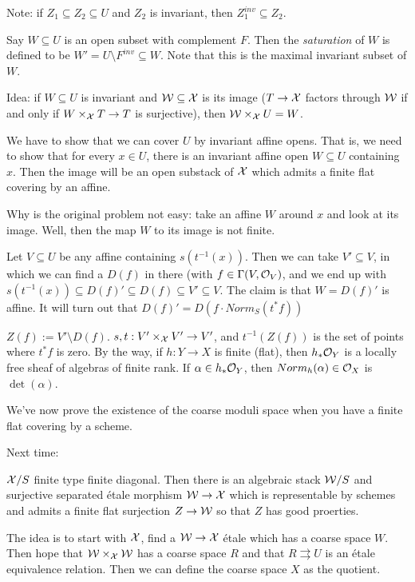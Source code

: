 Note: if $Z_1\subseteq Z_2\subseteq U$ and $Z_2$ is invariant, then
$Z_1^{inv}\subseteq Z_2$. 

Say $W\subseteq U$ is an open subset with complement $F$. Then the
\emph{saturation} of $W$ is defined to be $W'=U\setminus
F^{inv}\subseteq W$. Note that this is the maximal invariant subset
of $W$.

Idea: if $W\subseteq U$ is invariant and $\mathcal{W}\subseteq \mathcal{X}$ is its
image ($T\to \mathcal{X}$ factors through $\mathcal{W}$ if and only if $W\times_{\mathcal{X}} T\to
T$ is surjective), then $\mathcal{W}\times_{\mathcal{X}} U=W$.

We have to show that we can cover $U$ by invariant affine opens. That
is, we need to show that for every $x\in U$, there is an invariant
affine open $W\subseteq U$ containing $x$. Then the image will be an
open substack of $\mathcal{X}$ which admits a finite flat covering by an
affine.

Why is the original problem not easy: take an affine $W$ around $x$
and look at its image. Well, then the map $W$ to its image is not
finite.

Let $V\subseteq U$ be any affine containing $s(t^{-1}(x))$. Then we
can take $V'\subseteq V$, in which we can find a $D(f)$ in there
(with $f\in \Gamma(V,\mathcal{O}_V)$, and we end up with $s(t^{-1}(x))\subseteq
D(f)'\subseteq D(f)\subseteq V'\subseteq V$. The claim is that
$W=D(f)'$ is affine. It will turn out that $D(f)'=D(f\cdot
Norm_S(t^*f))$

$Z(f):= V'\setminus D(f)$. $s,t:V'\times_{\mathcal{X}} V'\to V'$, and
$t^{-1}(Z(f))$ is the set of points where $t^*f$ is zero. By the way,
if $h:Y\to X$ is finite (flat), then $h_*\mathcal{O}_Y$ is a locally free
sheaf of algebras of finite rank. If $\alpha\in h_*\mathcal{O}_Y$, then
$Norm_h(\alpha)\in \mathcal{O}_X$ is $\det (\alpha)$.

We've now prove the existence of the coarse moduli space when you
have a finite flat covering by a scheme.

Next time:
\begin{theorem}
  $\mathcal{X}/S$ finite type finite diagonal. Then there is an algebraic
stack $\mathcal{W}/S$ and surjective separated \'etale morphism $\mathcal{W}\to \mathcal{X}$
which is representable by schemes and admits a finite flat surjection
$Z\to \mathcal{W}$ so that $Z$ has good proerties.
\end{theorem}
The idea is to start with $\mathcal{X}$, find a $\mathcal{W}\to \mathcal{X}$ \'etale which has a
coarse space $W$. Then hope that $\mathcal{W}\times_{\mathcal{X}} \mathcal{W}$ has a coarse space
$R$ and that $R\rightrightarrows U$ is an \'etale equivalence
relation. Then we can define the coarse space $X$ as the quotient.

